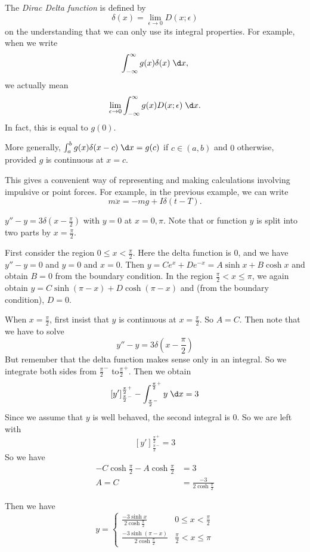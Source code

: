 \documentclass[a4paper]{article}
\begin{document}
\begin{defi}
  The \emph{Dirac Delta function} is defined by 
  \[
  \delta(x) = \lim_{\epsilon \to 0} D(x; \epsilon)
  \]
  on the understanding that we can only use its integral properties. For example, when we write
  \[
  \int_{-\infty}^{\infty} g(x)\delta (x) \;\d x,
  \]
  we actually mean
  \[
  \lim_{\epsilon \to 0} \int_{-\infty}^{\infty} g(x)D(x; \epsilon)\;\d x.
  \]
  In fact, this is equal to $g(0)$. 

  More generally, $\int_a^b g(x)\delta(x - c)\;\d x = g(c)$ if $c\in (a, b)$ and $0$ otherwise, provided $g$ is continuous at $x = c$.
\end{defi}

This gives a convenient way of representing and making calculations involving impulsive or point forces. For example, in the previous example, we can write
\[
m\ddot x = -mg + I\delta(t - T).
\]

\begin{eg}
  $y'' - y = 3\delta(x - \frac{\pi}{2})$ with $y = 0$ at $x = 0, \pi$. Note that or function $y$ is split into two parts by $x = \frac{\pi}{2}$.

First consider the region $0 \leq x < \frac{\pi}{2}$. Here the delta function is $0$, and we have $y'' - y = 0$ and $y = 0$ and $x = 0$. Then $y = Ce^x + De^{-x} = A\sinh x + B\cosh x$ and obtain $B = 0$ from the boundary condition. 
In the region $\frac{\pi}{2} < x \leq \pi$, we again obtain $y = C\sinh(\pi - x) + D\cosh (\pi - x)$ and (from the boundary condition), $D = 0$.

When $x = \frac{\pi}{2}$, first insist that $y$ is continuous at $x = \frac{\pi}{2}$. So $A = C$. Then note that we have to solve 
\[
y'' - y = 3\delta\left(x - \frac{\pi}{2}\right)
\]
But remember that the delta function makes sense only in an integral. So we integrate both sides from $\frac{\pi}{2}^-$ to$\frac{\pi}{2}^+$. Then we obtain
\[
[y']^{\frac{\pi}{2}^+}_{\frac{\pi}{2}^-} - \int_{\frac{\pi}{2}^-}^{\frac{\pi}{2}^+} y\;\d x= 3
\]
Since we assume that $y$ is well behaved, the second integral is 0. So we are left with 
\[
[y']^{\frac{\pi}{2}^+}_{\frac{\pi}{2}^-} = 3
\]
So we have 
\begin{align*}
  -C\cosh \frac{\pi}{2} - A\cosh\frac{\pi}{2} &= 3\\
  A = C &= \frac{-3}{2\cosh \frac{\pi}{2}}
\end{align*}
\end{eg}

Then we have 
\[
y =
\begin{cases}
  \frac{-3\sinh x}{2\cosh \frac{\pi}{2}} & 0 \leq x < \frac{\pi}{2}\\
  \frac{-3\sinh(\pi - x)}{2\cosh \frac{\pi}{2}} & \frac{\pi}{2} < x \leq \pi
\end{cases}
\]
\end{document}
